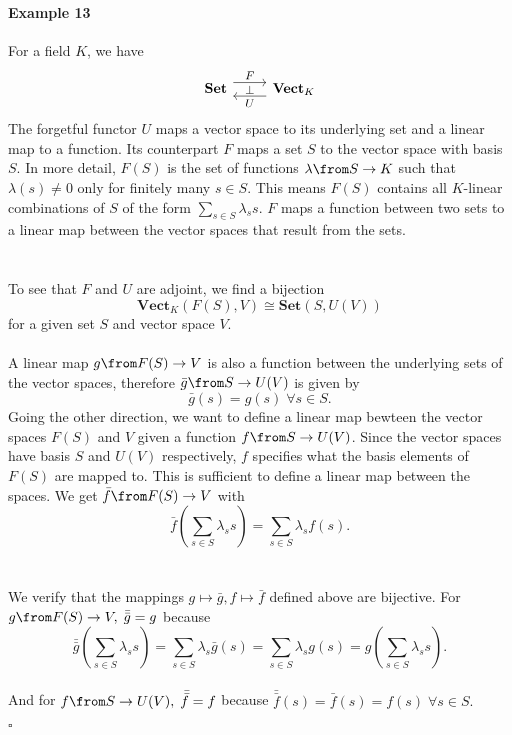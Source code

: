 \paragraph{Example 13}  For a field $K$, we have
	  \[ \begin{tikzcd}	
	[ampersand replacement=\&, every label/.append style = {font = \footnotesize}]
	\textbf{Set} \arrow[r, shift left=2,"F","\bot"']
	\& \textbf{Vect$_K$} \arrow[l, shift left=2, "U"]
	\end{tikzcd}\]
	The forgetful functor $U$ maps a vector space to its underlying set and a linear map to a function. Its counterpart $F$ maps a set $S$ to the vector space with basis $S$. %
	In more detail, $F(S)$ is the set of functions $\lambda \from S \to K$ such that $\lambda (s) \neq 0$ only for finitely many $s \in S$. This means $F(S)$ contains all $K$-linear combinations of $S$ of the form $\sum\limits_{s \in S} \lambda_s s$. $F$ maps a function between two sets to a linear map between the vector spaces that result from the sets.  \\\\\\
	To see that $F$ and $U$ are adjoint, we find a bijection
	\[\textbf{Vect}_K (F(S), V) \cong \textbf{Set}(S, U(V)) \] for a given set $S$ and vector space $V$.\\\\
	A linear map $g \from F(S) \to V$ is also a function between the underlying sets of the vector spaces, therefore $\bar g \from S \to U(V)$ is given by \[\bar g (s) = g (s) \; \forall s \in S.\]
	Going the other direction, we want to define a linear map bewteen the vector spaces $F(S)$ and $V$ given a function $f \from S \to U(V)$. Since the vector spaces have basis $S$ and $U(V)$ respectively, $f$ specifies what the basis elements of $F(S)$ are mapped to. This is sufficient to define a linear map between the spaces. We get $\bar f \from F(S) \to V$ with \[\bar f (\sum\limits_{s \in S} \lambda_s s) = \sum\limits_{s \in S} \lambda_s f(s).\]\\\\
	We verify that the mappings $g \mapsto \bar g, f \mapsto \bar f$ defined above are bijective. For $g \from F(S) \to V,\; \bar {\bar g} = g$ because
	\[\bar{\bar g} (\sum\limits_{s \in S} \lambda_s s) = \sum\limits_{s \in S} \lambda_s \bar g(s)
= \sum\limits_{s \in S} \lambda_s  g(s) = g(\sum\limits_{s \in S} \lambda_s  s).\]\\
	And for $f \from S \to U(V),\; \bar {\bar f} = f$ because $\bar {\bar f} (s) = \bar f (s) = f(s) \; \forall s \in S.$  {\begin{flushright}$\square$\end{flushright}}
